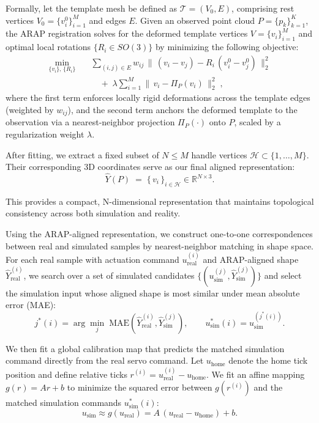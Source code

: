 \documentclass[letterpaper, 10 pt, conference]{ieeeconf}  %
\begin{document}
Formally, let the template mesh be defined as $\mathcal{T}=(V_0,E)$, comprising rest vertices $V_0=\{v_i^0\}_{i=1}^{M}$ and edges $E$. Given an observed point cloud $P=\{p_k\}_{k=1}^{K}$, the ARAP registration solves for the deformed template vertices $V=\{v_i\}_{i=1}^{M}$ and optimal local rotations $\{R_i \in SO(3)\}$ by minimizing the following objective: %
\begin{equation}
\begin{aligned}
\min_{\{v_i\},\,\{R_i\}}\quad
&\sum_{(i,j)\in E} w_{ij}\,\big\lVert\,(v_i-v_j)-R_i\,(v_i^0-v_j^0)\,\big\rVert_2^2 \\
&\quad+\;\lambda \sum_{i=1}^{M}\big\lVert\,v_i-\Pi_{P}(v_i)\,\big\rVert_2^2 \;,
\end{aligned}
\label{eq:arap_align}
\end{equation}
where the first term enforces locally rigid deformations across the template edges (weighted by $w_{ij}$), and the second term anchors the deformed template to the observation via a nearest-neighbor projection $\Pi_{P}(\cdot)$ onto $P$, scaled by a regularization weight $\lambda$.

After fitting, we extract a fixed subset of $N\leq M$ handle vertices $\mathcal{H}\subset\{1,\dots,M\}$. Their corresponding 3D coordinates serve as our final aligned representation: 
\begin{equation}
\hat{Y}(P) \;=\; \{\,v_i\,\}_{i\in\mathcal{H}} \in \mathbb{R}^{N\times 3}.
\label{eq:arap_handles}
\end{equation}

\noindent This provides a compact, N-dimensional representation that maintains topological consistency across both simulation and reality.

Using the ARAP-aligned representation, we construct one-to-one correspondences between real and simulated samples by nearest-neighbor matching in shape space. For each real sample with actuation command $u_{\text{real}}^{(i)}$ and ARAP-aligned shape $\hat{Y}_{\text{real}}^{(i)}$, we search over a set of simulated candidates $\{(u_{\text{sim}}^{(j)}, \hat{Y}_{\text{sim}}^{(j)})\}$ and select the simulation input whose aligned shape is most similar under mean absolute error (MAE):
\[
j^{*}(i)=\arg\min_{j}\; \mathrm{MAE}\!\left(\hat{Y}^{(i)}_{\text{real}},\hat{Y}^{(j)}_{\text{sim}}\right),
\qquad
u^{*}_{\text{sim}}(i)=u^{(j^{*}(i))}_{\text{sim}}.
\]

\noindent We then fit a global calibration map that predicts the matched simulation command directly from the real servo command. Let $u_{\text{home}}$ denote the home tick position and define relative ticks $r^{(i)} = u_{\text{real}}^{(i)} - u_{\text{home}}$. We fit an affine mapping $g(r) = Ar + b$ to minimize the squared error between $g(r^{(i)})$ and the matched simulation commands $u_{\text{sim}}^*(i)$:
\[
u_{\text{sim}} \approx g(u_{\text{real}})=A\,(u_{\text{real}}-u_{\text{home}})+b.
\]
\end{document}
